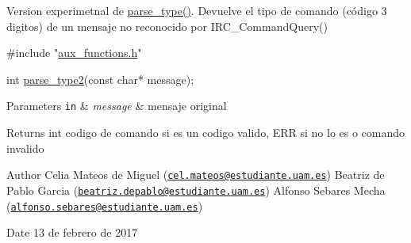 Version experimetnal de \hyperlink{aux__functions_8h_a90798d5fe15fdd743f8802b0f154b854}{parse\-\_\-type()}. Devuelve el tipo de comando (código 3 digitos) de un mensaje no reconocido por I\-R\-C\-\_\-\-Command\-Query()


\begin{DoxyCode}
\textcolor{preprocessor}{#include "\hyperlink{aux__functions_8h}{aux\_functions.h}"}

\textcolor{keywordtype}{int} \hyperlink{aux__functions_8h_a1738b19e427c47733b310cbe08431a56}{parse\_type2}(\textcolor{keyword}{const} \textcolor{keywordtype}{char}* message);
\end{DoxyCode}



\begin{DoxyParams}[1]{Parameters}
\mbox{\tt in}  & {\em message} & mensaje original\\
\hline
\end{DoxyParams}
\begin{DoxyReturn}{Returns}
int codigo de comando si es un codigo valido, E\-R\-R si no lo es o comando invalido
\end{DoxyReturn}
\begin{DoxyAuthor}{Author}
Celia Mateos de Miguel (\href{mailto:cel.mateos@estudiante.uam.es}{\tt cel.\-mateos@estudiante.\-uam.\-es}) Beatriz de Pablo Garcia (\href{mailto:beatriz.depablo@estudiante.uam.es}{\tt beatriz.\-depablo@estudiante.\-uam.\-es}) Alfonso Sebares Mecha (\href{mailto:alfonso.sebares@estudiante.uam.es}{\tt alfonso.\-sebares@estudiante.\-uam.\-es})
\end{DoxyAuthor}
\begin{DoxyDate}{Date}
13 de febrero de 2017
\end{DoxyDate}


 